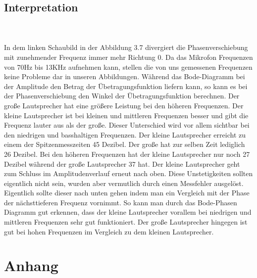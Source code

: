 \documentclass[12pt, oneside, a4paper, \docLanguage]{report}
\begin{document}
\newpage
\section{Interpretation}
\label{chap:VERSUCH_2_INTERPRETATION}
\\~\\
In dem linken Schaubild in der Abbildung 3.7 divergiert die Phasenverschiebung mit zunehmender Frequenz immer mehr Richtung 0.
\newline
Da das Mikrofon Frequenzen von 70Hz bis 13KHz aufnehmen kann, stellen die von uns gemessenen Frequenzen keine Probleme dar in unseren Abbildungen.
\newline
Während das Bode-Diagramm bei der Amplitude den Betrag der Übetragungsfunktion liefern kann, so kann es bei der Phasenverschiebung den Winkel der Übetragungsfunktion berechnen.
\newline
Der große Lautsprecher hat eine größere Leistung bei den höheren Frequenzen. Der kleine Lautsprecher ist bei kleinen und mittleren Frequenzen besser und gibt die Frequenz lauter aus als der große.
\newline
Dieser Unterschied wird vor allem sichtbar bei den niedrigen und basshaltigen Frequenzen.
Der kleine Lautsprecher erreicht zu einem der Spitzenmesszeiten 45 Dezibel.
\newline
Der große hat zur selben Zeit lediglich 26 Dezibel.
Bei den höheren Frequenzen hat der kleine Lautsprecher nur noch 27 Dezibel während der große Lautsprecher 37 hat.
\newline
\newline
Der kleine Lautsprecher geht zum Schluss im Amplitudenverlauf erneut nach oben. Diese Unstetigkeiten sollten eigentlich nicht sein, wurden aber vermutlich durch einen Messfehler ausgelöst.
\newline 
Eigentlich sollte dieser nach unten gehen indem man ein Vergleich mit der Phase der nächsttieferen Frequenz vornimmt.
So kann man durch das Bode-Phasen Diagramm gut erkennen, dass der kleine Lautsprecher vorallem bei niedrigen und mittleren Frequenzen sehr gut funktioniert.
Der große Lautsprecher hingegen ist gut bei hohen Frequenzen im Vergleich zu dem kleinen Lautsprecher.


%
%
\renewcommand\thesection{A.\arabic{section}}
\renewcommand\thesubsection{\thesection.\arabic{subsection}}

\chapter*{Anhang}
\label{chap:APPENDIX}
\addtocounter{chapter}{1}
\setcounter{section}{0}
\end{document}
